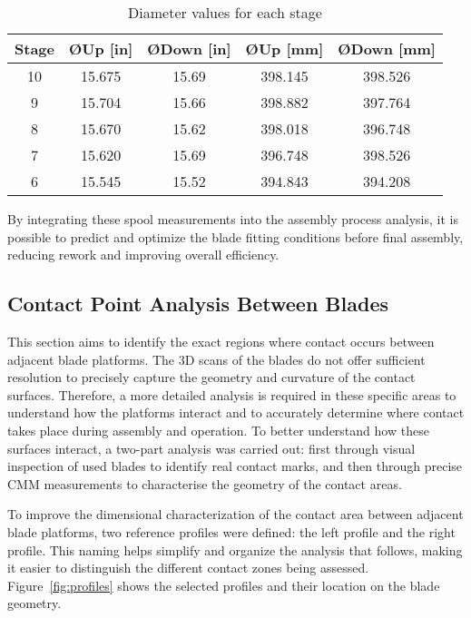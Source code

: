 \begin{table}[h]
    \centering
    \begin{tabular}{ccccc}
        \hline
        Stage & ØUp [in] & ØDown [in] & ØUp [mm] & ØDown [mm]\\
        \hline
        10 & 15.675 & 15.69 & 398.145 & 398.526 \\
        9  & 15.704 & 15.66 & 398.882 & 397.764 \\
        8  & 15.670 & 15.62 & 398.018 & 396.748 \\
        7  & 15.620 & 15.69 & 396.748 & 398.526 \\
        6  & 15.545 & 15.52 & 394.843 & 394.208 \\
        \hline
    \end{tabular}
    \caption{Diameter values for each stage}
    \label{tab:diameters}
\end{table}

By integrating these spool measurements into the assembly process analysis, it is possible to predict and optimize the blade fitting conditions before final assembly, reducing rework and improving overall efficiency.

\subsection{Contact Point Analysis Between Blades}
\label{cha:contacto}
This section aims to identify the exact regions where contact occurs between adjacent blade platforms. The 3D scans of the blades do not offer sufficient resolution to precisely capture the geometry and curvature of the contact surfaces. Therefore, a more detailed analysis is required in these specific areas to understand how the platforms interact and to accurately determine where contact takes place during assembly and operation.
To better understand how these surfaces interact, a two-part analysis was carried out: first through visual inspection of used blades to identify real contact marks, and then through precise CMM measurements to characterise the geometry of the contact areas.

To improve the dimensional characterization of the contact area between adjacent blade platforms, two reference profiles were defined: the left profile and the right profile. This naming helps simplify and organize the analysis that follows, making it easier to distinguish the different contact zones being assessed. Figure~\ref{fig:profiles} shows the selected profiles and their location on the blade geometry.

